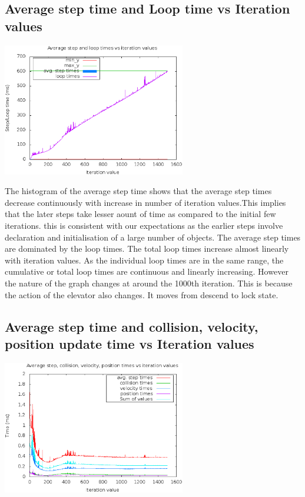 \documentclass[a4paper,11pt]{article}
\begin{document}
\subsection{Average step time and Loop time vs Iteration values}

\begin{center}
\includegraphics[width=0.6\textwidth]{plots/g05_plot01.eps} 
\end{center}

The histogram of the average step time shows that the average step times decrease continuously with increase in number of iteration values.This implies that the later steps take lesser aount of time as compared to the initial few iterations. this is consistent with our expectations as the earlier steps involve declaration and initialisation of a large number of objects.
The average step times are dominated by the loop times. The total loop times increase almost linearly with iteration values. As the individual loop times are in the same range, the cumulative or total loop times are continuous and linearly increasing.   
However the nature of the graph changes at around the 1000th iteration. This is because the action of the elevator also changes. It moves from descend to lock state.

\subsection{Average step time and collision, velocity, position update time vs Iteration values}

\begin{center}
\includegraphics[width=0.6\textwidth]{plots/g05_plot02.eps} 
\end{center}
\end{document}
